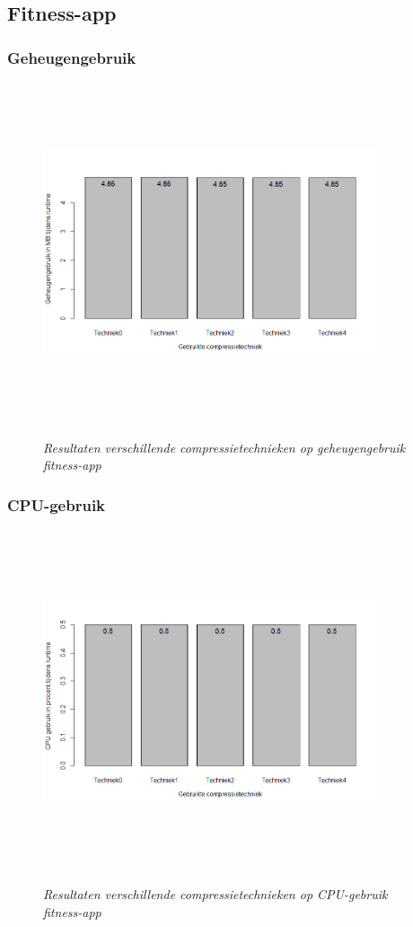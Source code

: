 \subsection{Fitness-app}
\subsubsection{Geheugengebruik}
\begin{figure}[H]
	\centering
	\caption{\textit{Resultaten verschillende compressietechnieken op geheugengebruik fitness-app}}
	\includegraphics[width=10cm, height=10cm, keepaspectratio]{img/app2geheugen}\\[.5cm]
	
\end{figure}
\subsubsection{CPU-gebruik}
\begin{figure}[H]
	\centering
	\caption{\textit{Resultaten verschillende compressietechnieken op CPU-gebruik fitness-app}}
	\includegraphics[width=10cm, height=10cm, keepaspectratio]{img/app2cpu}\\[.5cm]
	
\end{figure}
